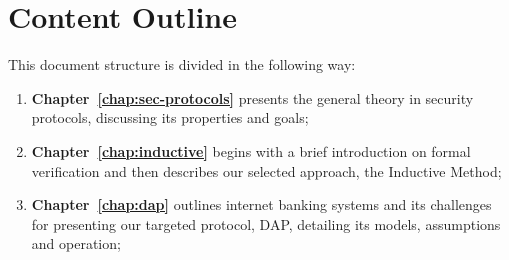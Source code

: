\section{Content Outline}

This document structure is divided in the following way:

\begin{enumerate}
    \item \textbf{Chapter~\ref{chap:sec-protocols}} presents the general theory in security protocols, discussing its properties and goals;

    \item \textbf{Chapter~\ref{chap:inductive}} begins with a brief introduction on formal verification and then describes our selected approach, the Inductive Method;

    \item \textbf{Chapter~\ref{chap:dap}} outlines internet banking systems and its challenges for presenting our targeted protocol, DAP, detailing its models, assumptions and operation;

\end{enumerate}

